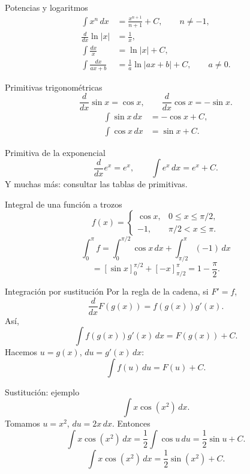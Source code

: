 \documentclass[original_version/main.tex]{subfiles}
\begin{document}
\begin{frame}{Potencias y logaritmos}
\begin{align*}\int x^n\,dx&=\frac{x^{n+1}}{n+1}+C,\qquad n\ne-1,\\\frac{d}{dx}\ln|x|&=\frac1x,\\\int\frac{dx}{x}&=\ln|x|+C,\\\int\frac{dx}{ax+b}&=\frac1a\ln|ax+b|+C,\qquad a\ne0.\end{align*}
\end{frame}

\begin{frame}{Primitivas trigonométricas}
\[\frac{d}{dx}\sin x=\cos x,\qquad\frac{d}{dx}\cos x=-\sin x.\]\begin{align*}\int\sin x\,dx&=-\cos x+C,\\\int\cos x\,dx&=\sin x+C.\end{align*}
\end{frame}

\begin{frame}{Primitiva de la exponencial}
\[\frac{d}{dx}e^x=e^x,\qquad\int e^x\,dx=e^x+C.\]\medskip Y muchas más: consultar las tablas de primitivas.
\end{frame}

\begin{frame}{Integral de una función a trozos}
\small\[f(x)=\begin{cases}\cos x,&0\le x\le\pi/2,\\-1,&\pi/2<x\le\pi.\end{cases}\]\[\int_0^\pi f=\int_0^{\pi/2}\cos x\,dx+\int_{\pi/2}^{\pi}(-1)\,dx\]\[=[\sin x]_0^{\pi/2}+[-x]_{\pi/2}^{\pi}=1-\frac\pi2.\]
\end{frame}

\begin{frame}{Integración por sustitución}
Por la regla de la cadena, si $F\prime=f$,\[\frac{d}{dx}F(g(x))=f(g(x))g\prime(x).\]Así,\[\int f(g(x))g\prime(x)\,dx=F(g(x))+C.\]Hacemos $u=g(x)$, $du=g\prime(x)\,dx$:\[\int f(u)\,du=F(u)+C.\]
\end{frame}

\begin{frame}{Sustitución: ejemplo}
\[\int x\cos(x^2)\,dx.\]Tomamos $u=x^2$, $du=2x\,dx$. Entonces\[\int x\cos(x^2)\,dx=\frac12\int\cos u\,du=\frac12\sin u+C.\]\[\boxed{\int x\cos(x^2)\,dx=\frac12\sin(x^2)+C.}\]
\end{frame}
\end{document}
